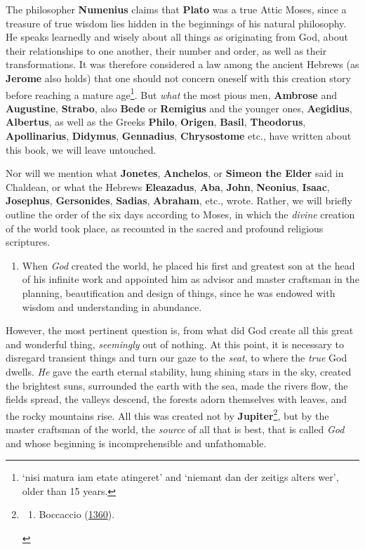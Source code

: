 \documentclass[
]{article}
\providecommand{\tightlist}{%
  \setlength{\itemsep}{0pt}\setlength{\parskip}{0pt}}
\begin{document}
The philosopher \textbf{Numenius} claims that \textbf{Plato} was a true
Attic Moses, since a treasure of true wisdom lies hidden in the
beginnings of his natural philosophy. He speaks learnedly and wisely
about all things as originating from God, about their relationships to
one another, their number and order, as well as their transformations.
It was therefore considered a law among the ancient Hebrews (as
\textbf{Jerome} also holds) that one should not concern oneself with
this creation story before reaching a mature age\footnote{`nisi matura
  iam etate atingeret' and `niemant dan der zeitigs alters wer', older
  than 15 years.}. But \emph{what} the most pious men, \textbf{Ambrose}
and \textbf{Augustine}, \textbf{Strabo}, also \textbf{Bede} or
\textbf{Remigius} and the younger ones, \textbf{Aegidius},
\textbf{Albertus}, as well as the Greeks \textbf{Philo},
\textbf{Origen}, \textbf{Basil}, \textbf{Theodorus},
\textbf{Apollinarius}, \textbf{Didymus}, \textbf{Gennadius},
\textbf{Chrysostome} etc., have written about this book, we will leave
untouched.

Nor will we mention what \textbf{Jonetes}, \textbf{Anchelos}, or
\textbf{Simeon the Elder} said in Chaldean, or what the Hebrews
\textbf{Eleazadus}, \textbf{Aba}, \textbf{John}, \textbf{Neonius},
\textbf{Isaac}, \textbf{Josephus}, \textbf{Gersonides}, \textbf{Sadias},
\textbf{Abraham}, etc., wrote. Rather, we will briefly outline the order
of the six days according to Moses, in which the \emph{divine} creation
of the world took place, as recounted in the sacred and profound
religious scriptures.

\begin{enumerate}
\def\labelenumi{(\Roman{enumi})}
\setcounter{enumi}{1}
\tightlist
\item
  When \emph{God} created the world, he placed his first and greatest
  son at the head of his infinite work and appointed him as advisor and
  master craftsman in the planning, beautification and design of things,
  since he was endowed with wisdom and understanding in abundance.
\end{enumerate}

However, the most pertinent question is, from what did God create all
this great and wonderful thing, \emph{seemingly} out of nothing. At this
point, it is necessary to disregard transient things and turn our gaze
to the \emph{seat}, to where the \emph{true} God dwells. \emph{He} gave
the earth eternal stability, hung shining stars in the sky, created the
brightest suns, surrounded the earth with the sea, made the rivers flow,
the fields spread, the valleys descend, the forests adorn themselves
with leaves, and the rocky mountains rise. All this was created not by
\textbf{Jupiter}\footnote{\begin{enumerate}
  \def\labelenumi{\alph{enumi}.}
  \setcounter{enumi}{18}
  \tightlist
  \item
    Boccaccio
    (\href{https://digi.vatlib.it/view/MSS_Pal.lat.938}{1360}).
  \end{enumerate}}, but by the master craftsman of the world, the
\emph{source} of all that is best, that is called \emph{God} and whose
beginning is incomprehensible and unfathomable.
\end{document}
